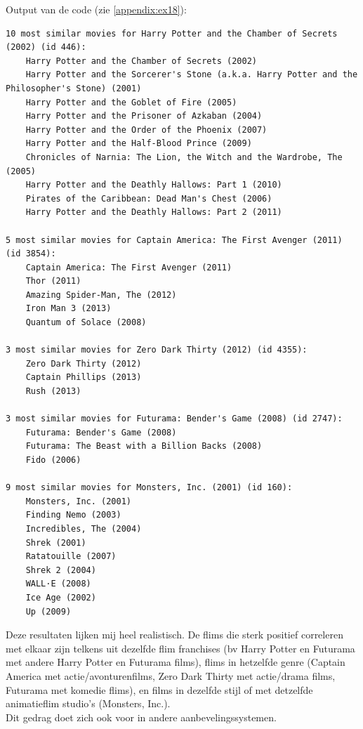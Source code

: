 \documentclass[11pt, a4paper, titlepage, openright]{article}
\begin{document}
	Output van de code (zie \ref{appendix:ex18}):
\begin{lstlisting}
10 most similar movies for Harry Potter and the Chamber of Secrets (2002) (id 446):
    Harry Potter and the Chamber of Secrets (2002)
    Harry Potter and the Sorcerer's Stone (a.k.a. Harry Potter and the Philosopher's Stone) (2001)
    Harry Potter and the Goblet of Fire (2005)
    Harry Potter and the Prisoner of Azkaban (2004)
    Harry Potter and the Order of the Phoenix (2007)
    Harry Potter and the Half-Blood Prince (2009)
    Chronicles of Narnia: The Lion, the Witch and the Wardrobe, The (2005)
    Harry Potter and the Deathly Hallows: Part 1 (2010)
    Pirates of the Caribbean: Dead Man's Chest (2006)
    Harry Potter and the Deathly Hallows: Part 2 (2011)

5 most similar movies for Captain America: The First Avenger (2011) (id 3854):
    Captain America: The First Avenger (2011)
    Thor (2011)
    Amazing Spider-Man, The (2012)
    Iron Man 3 (2013)
    Quantum of Solace (2008)

3 most similar movies for Zero Dark Thirty (2012) (id 4355):
    Zero Dark Thirty (2012)
    Captain Phillips (2013)
    Rush (2013)

3 most similar movies for Futurama: Bender's Game (2008) (id 2747):
    Futurama: Bender's Game (2008)
    Futurama: The Beast with a Billion Backs (2008)
    Fido (2006)

9 most similar movies for Monsters, Inc. (2001) (id 160):
    Monsters, Inc. (2001)
    Finding Nemo (2003)
    Incredibles, The (2004)
    Shrek (2001)
    Ratatouille (2007)
    Shrek 2 (2004)
    WALL·E (2008)
    Ice Age (2002)
    Up (2009)   
\end{lstlisting}

    Deze resultaten lijken mij heel realistisch. De flims die sterk positief correleren met elkaar zijn telkens
    uit dezelfde flim franchises (bv Harry Potter en Futurama met andere Harry Potter en Futurama films),
    flims in hetzelfde genre (Captain America met actie/avonturenfilms, Zero Dark Thirty met actie/drama films, Futurama met komedie flims),
    en films in dezelfde stijl of met detzelfde animatieflim studio's (Monsters, Inc.). \\
    Dit gedrag doet zich ook voor in andere aanbevelingssystemen.

\end{document}
